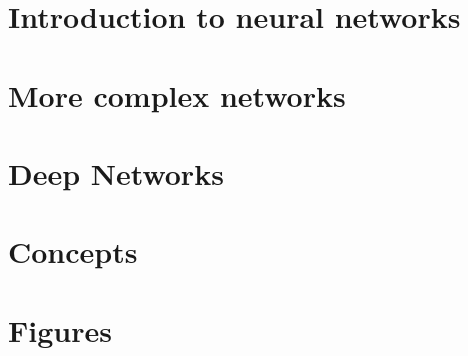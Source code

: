 \documentclass[14pt]{report}
\begin{document}
\tableofcontents
\chapter{Introduction to neural networks}




\chapter{More complex networks}


\chapter{Deep Networks}
\chapter{Concepts}


\chapter{Figures}

\end{document}
